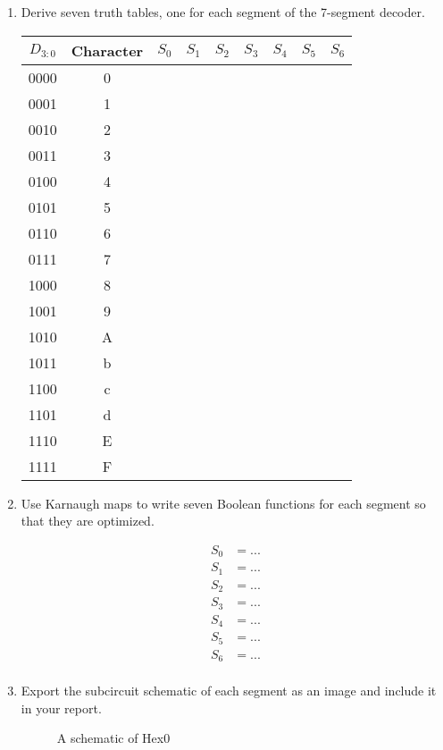 \documentclass[parskip=half]{scrarticle}
\begin{document}
\begin{enumerate}
\item Derive seven truth tables, one for each segment of the 7-segment decoder.

\begin{table}[ht!]
\small
\centering
\begin{tabular}{c|c|ccccccc}
$D_{3:0}$& Character & $S_0$ & $S_1$ & $S_2$ & $S_3$ & $S_4$ & $S_5$ & $S_6$\\
\hline
0000 & 0 \\
0001 & 1\\
0010 & 2\\
0011 & 3\\
0100 & 4\\
0101 & 5\\
0110 & 6\\
0111 & 7\\
1000 & 8\\
1001 & 9\\
1010 & A\\
1011 & b\\
1100 & c\\
1101 & d\\
1110 & E\\
1111 & F\\
\end{tabular}
\end{table}

\item Use Karnaugh maps to write seven Boolean functions for each segment so that they are optimized.

\begin{align*}
    S_0 &= ... \\
    S_1 &= ... \\
    S_2 &= ... \\
    S_3 &= ... \\
    S_4 &= ... \\
    S_5 &= ... \\
    S_6 &= ... \\
\end{align*}

\item 
    Export the subcircuit schematic of each segment as an image and include it in your report.

\begin{figure}[ht!]
    \centering
    \caption{A schematic of Hex0}
    \label{f:part2_hex0}
\end{figure}


\end{enumerate}
\end{document}
